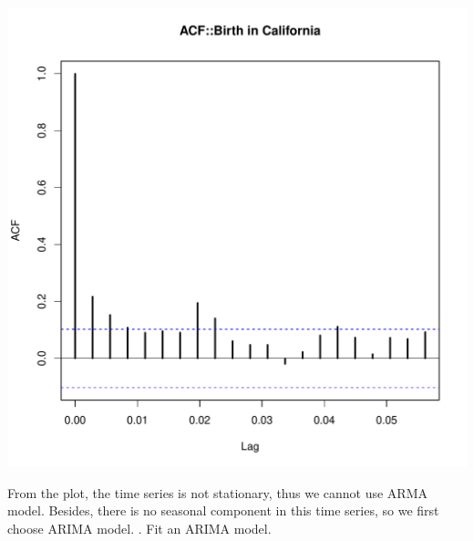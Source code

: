 \documentclass[10pt]{article}\usepackage[]{graphicx}\usepackage[]{color}
\makeatletter
\def\maxwidth{ %
  \ifdim\Gin@nat@width>\linewidth
    \linewidth
  \else
    \Gin@nat@width
  \fi
}
\newenvironment{kframe}{%
 \def\at@end@of@kframe{}%
 \ifinner\ifhmode%
  \def\at@end@of@kframe{\end{minipage}}%
  \begin{minipage}{\columnwidth}%
 \fi\fi%
 \def\FrameCommand##1{\hskip\@totalleftmargin \hskip-\fboxsep
 \colorbox{shadecolor}{##1}\hskip-\fboxsep
     \hskip-\linewidth \hskip-\@totalleftmargin \hskip\columnwidth}%
 \MakeFramed {\advance\hsize-\width
   \@totalleftmargin\z@ \linewidth\hsize
   \@setminipage}}%
 {\par\unskip\endMakeFramed%
 \at@end@of@kframe}
\newenvironment{knitrout}{}{} %
\makeatother
\begin{document}
\begin{knitrout}
\begin{kframe}
\begin{alltt}
\end{alltt}
\end{kframe}
\includegraphics[width=\maxwidth]{figure/unnamed-chunk-8-2} 

\end{knitrout}
From the plot, the time series is not stationary, thus we cannot use ARMA model. Besides, there is no seasonal component in this time series, so we first choose ARIMA model.
. Fit an ARIMA model.
\end{document}
